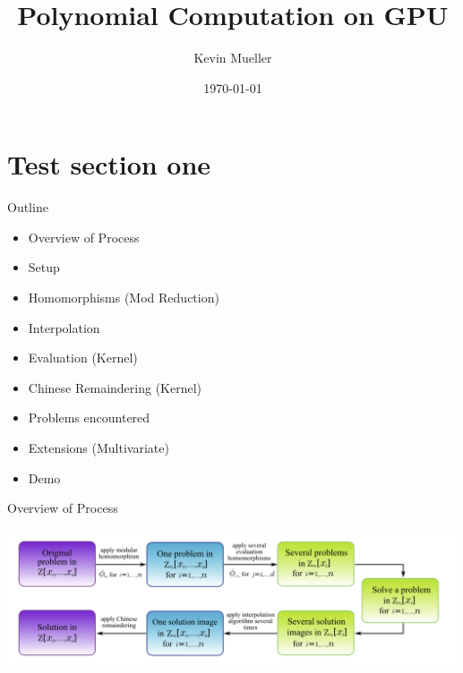 \documentclass{beamer}
\title[GPU polynomial computation]{Polynomial Computation on GPU} %
\author{Kevin Mueller} %
\institute[UW] %
{
	\\ %
	\medskip
}
\date{\today} %
\begin{document}
	
	\begin{frame}
		\maketitle
	
		
	\end{frame}
	
	\section{Test section one}
	\begin{frame}{Outline}
	
		\vspace{0.2in}
		\begin{itemize}
			\item Overview of Process
			\item Setup
			\item Homomorphisms (Mod Reduction)
			\item Interpolation 
			\item Evaluation (Kernel)
			\item Chinese Remaindering (Kernel)
			\item Problems encountered
			\item Extensions (Multivariate)
			\item Demo
		\end{itemize}
		
	\end{frame}
	
	
	\begin{frame}{	Overview of Process}

	
	
		\includegraphics[width=0.995\textwidth]{../Code/Images/diagram_homomorphisms.png}
	
	\end{frame}
	
\end{document}
